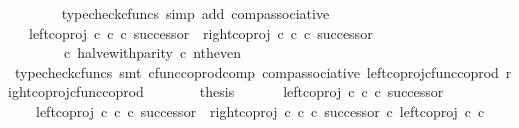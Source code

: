 \begin{isabellebody}
\ \ \ \ \ \ \isamarkupfalse%
\ {\isacharparenleft}{\kern0pt}typecheck{\isacharunderscore}{\kern0pt}cfuncs{\isacharcomma}{\kern0pt}\ simp\ add{\isacharcolon}{\kern0pt}\ comp{\isacharunderscore}{\kern0pt}associative{}{\isacharparenright}{\kern0pt}\isanewline
\ \ \ \ \isamarkupfalse%
\ \isamarkupfalse%
\ {\isachardoublequoteopen}{\isachardot}{\kern0pt}{\isachardot}{\kern0pt}{\isachardot}{\kern0pt}\ {\isacharequal}{\kern0pt}\ {\isacharparenleft}{\kern0pt}{\isacharparenleft}{\kern0pt}left{\isacharunderscore}{\kern0pt}coproj\ {\isasymnat}\isactrlsub c\ {\isasymnat}\isactrlsub c\ {\isasymcirc}\isactrlsub c\ successor{\isacharparenright}{\kern0pt}\ {\isasymamalg}\ {\isacharparenleft}{\kern0pt}right{\isacharunderscore}{\kern0pt}coproj\ {\isasymnat}\isactrlsub c\ {\isasymnat}\isactrlsub c\ {\isasymcirc}\isactrlsub c\ successor{\isacharparenright}{\kern0pt}{\isacharparenright}{\kern0pt}\isanewline
\ \ \ \ \ \ \ \ {\isasymcirc}\isactrlsub c\ halve{\isacharunderscore}{\kern0pt}with{\isacharunderscore}{\kern0pt}parity\ {\isasymcirc}\isactrlsub c\ nth{\isacharunderscore}{\kern0pt}even{\isachardoublequoteclose}\isanewline
\ \ \ \ \ \ \isamarkupfalse%
\ {\isacharparenleft}{\kern0pt}typecheck{\isacharunderscore}{\kern0pt}cfuncs{\isacharcomma}{\kern0pt}\ smt\ cfunc{\isacharunderscore}{\kern0pt}coprod{\isacharunderscore}{\kern0pt}comp\ comp{\isacharunderscore}{\kern0pt}associative{}\ left{\isacharunderscore}{\kern0pt}coproj{\isacharunderscore}{\kern0pt}cfunc{\isacharunderscore}{\kern0pt}coprod\ right{\isacharunderscore}{\kern0pt}coproj{\isacharunderscore}{\kern0pt}cfunc{\isacharunderscore}{\kern0pt}coprod{\isacharparenright}{\kern0pt}\isanewline
\ \ \ \ \isamarkupfalse%
\ \isamarkupfalse%
\ {\isacharquery}{\kern0pt}thesis\isacommand{{\isachardot}{\kern0pt}}\isamarkupfalse%
\isanewline
\ \ \isamarkupfalse%
\isanewline
\isanewline
\ \ \isamarkupfalse%
\ {\isachardoublequoteopen}left{\isacharunderscore}{\kern0pt}coproj\ {\isasymnat}\isactrlsub c\ {\isasymnat}\isactrlsub c\ {\isasymcirc}\isactrlsub c\ successor\ {\isacharequal}{\kern0pt}\isanewline
\ \ \ \ {\isacharparenleft}{\kern0pt}left{\isacharunderscore}{\kern0pt}coproj\ {\isasymnat}\isactrlsub c\ {\isasymnat}\isactrlsub c\ {\isasymcirc}\isactrlsub c\ successor{\isacharparenright}{\kern0pt}\ {\isasymamalg}\ {\isacharparenleft}{\kern0pt}right{\isacharunderscore}{\kern0pt}coproj\ {\isasymnat}\isactrlsub c\ {\isasymnat}\isactrlsub c\ {\isasymcirc}\isactrlsub c\ successor{\isacharparenright}{\kern0pt}\ {\isasymcirc}\isactrlsub c\ left{\isacharunderscore}{\kern0pt}coproj\ {\isasymnat}\isactrlsub c\ {\isasymnat}\isactrlsub c{\isachardoublequoteclose}\isanewline

\end{isabellebody}
